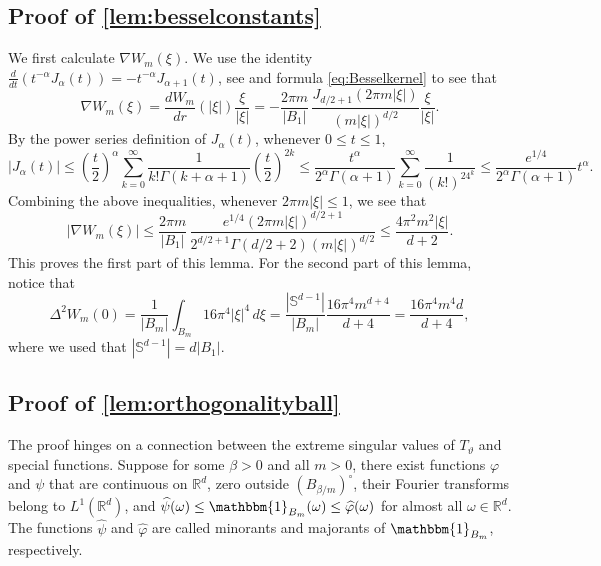 \documentclass[11pt]{article}
\theoremstyle{definition}
\numberwithin{theorem}{section}
\numberwithin{lemma}{section}
\numberwithin{equation}{section}
\def\R{\mathbb{R}}
\def\S{\mathbb{S}}
\renewcommand{\hat}{\widehat}
\numberwithin{equation}{section}
\begin{document}
		

	
	\subsection{Proof of \cref{lem:besselconstants}}
	\label{proof:besselconstants}
	
		We first calculate $\nabla W_m(\xi)$. We use the identity $\frac d {dt}(t^{-\alpha}J_\alpha(t))=-t^{-\alpha} J_{\alpha+1}(t)$, see \cite[equation (6), page 46]{watson1922treatise}
		and formula \eqref{eq:Besselkernel} to see that
		\begin{equation}
			\label{eq:nablaW}
			\nabla W_m(\xi)
			= \frac {dW_m}{dr}(|\xi|) \frac \xi {|\xi|}	
			= - \frac{2\pi m}{|B_1|} \, \frac{J_{d/2+1}(2\pi m|\xi|)}{(m |\xi|)^{d/2}} \frac \xi {|\xi|}. 
		\end{equation}
		By the power series definition of $J_\alpha(t)$, whenever $0\leq t\leq 1$,
		$$
		|J_\alpha(t)|
		\leq \left(\frac t 2 \right)^\alpha \sum_{k=0}^\infty \frac 1 {k! \Gamma(k+\alpha+1)} \left(\frac t 2 \right)^{2k}
		\leq \frac{t^\alpha}{2^\alpha\Gamma(\alpha+1)}\sum_{k=0}^\infty \frac 1 {(k!)^24^k}
		\leq \frac{e^{1/4}}{2^\alpha \Gamma(\alpha+1)} t^\alpha.
		$$
		Combining the above inequalities, whenever $2\pi m |\xi|\leq 1$, we see that
		$$
		|\nabla W_m(\xi)|
		\leq \frac{2\pi m}{|B_1|} \, \frac{e^{1/4}(2\pi m|\xi|)^{d/2+1}}{2^{d/2+1}\Gamma(d/2+2)(m |\xi|)^{d/2}}
		\leq \frac{4\pi^2 m^2 |\xi|}{d+2}. 
		$$ 
		This proves the first part of this lemma. For the second part of this lemma, notice that
		$$
		\Delta^2 W_m (0)
		= \frac{1}{|B_m|}\int_{B_m} 16 \pi^4 |\xi|^4 \, d\xi
		= \frac{|\S^{d-1}|}{|B_m|} \frac{16 \pi^4 m^{d+4}}{d+4}
		= \frac{16 \pi^4 m^4 d}{d+4},
		$$
		where we used that $|\S^{d-1}|=d |B_1|$.  
	
	\subsection{Proof of \cref{lem:orthogonalityball}}
	\label{proof:orthogonalityball}
		The proof hinges on a connection between the extreme singular values of $T_\vartheta$ and special functions. Suppose for some $\beta>0$ and all $m>0$, there exist functions $\varphi$ and $\psi$ that are continuous on $\R^d$, zero outside $(B_{\beta/m})^\circ$, their Fourier transforms belong to $L^1(\R^d)$, and $\hat\psi(\omega)\leq \mathbbm{1}_{B_m}(\omega)\leq \hat \varphi(\omega)$ for almost all $\omega\in\R^d$. The functions $\hat\psi$ and $\hat\varphi$ are called minorants and majorants of $\mathbbm{1}_{B_m}$, respectively. 
		
\end{document}
